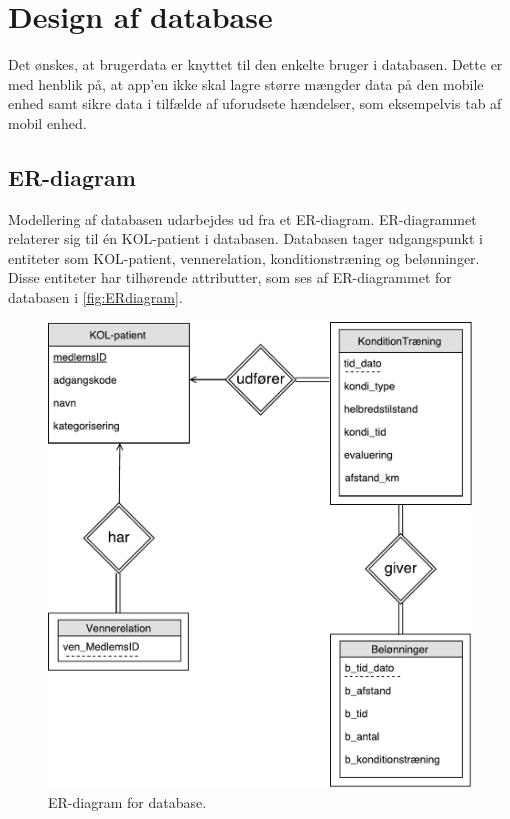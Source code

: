 \newpage
\section{Design af database} \label{sec:ER}
Det ønskes, at brugerdata er knyttet til den enkelte bruger i databasen. Dette er med henblik på, at app'en ikke skal lagre større mængder data på den mobile enhed samt sikre data i tilfælde af uforudsete hændelser, som eksempelvis tab af mobil enhed. 

\subsection*{ER-diagram}
Modellering af databasen udarbejdes ud fra et ER-diagram. ER-diagrammet relaterer sig til én KOL-patient i databasen. Databasen tager udgangspunkt i entiteter som KOL-patient, vennerelation, konditionstræning og belønninger. Disse entiteter har tilhørende attributter, som ses af ER-diagrammet for databasen i \autoref{fig:ERdiagram}.

\begin{figure} [H]
\centering
\includegraphics[width=1\textwidth]{figures/Aktivitetsdiagram/ERdiagram}
\caption{ER-diagram for database.}
\label{fig:ERdiagram}
\end{figure} 

